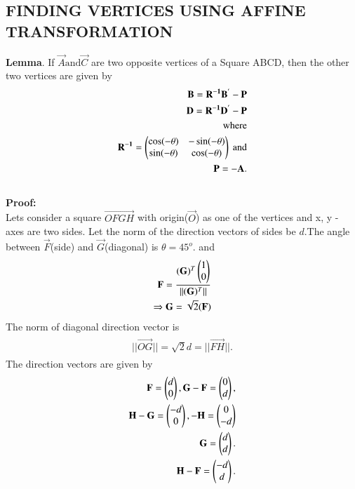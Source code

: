 \documentclass[journal,12pt,twocolumn]{IEEEtran}
\begin{document}
\subsection{FINDING VERTICES USING AFFINE TRANSFORMATION}
\textbf{Lemma}.
If $\vec{A} \text{and} \vec{C}$ are two opposite vertices of a Square ABCD, then the other two vertices are given by
\begin{align}
\begin{split}
\mathbf{B} = \mathbf{R^{-1}B^{'}}-\mathbf{P}\\
\mathbf{D} = \mathbf{R^{-1}D^{'}}-\mathbf{P}\\
\text{where}\\
\mathbf{R^{-1}} = \begin{pmatrix}\cos (-\theta) & -\sin (-\theta) \\ \sin (-\theta) & \cos (-\theta)\end{pmatrix} \ \text{and}\\
\mathbf{P} =  - \mathbf{A}.\\
\end{split}
\end{align}
\\
\textbf{Proof:}
\\
Lets consider a square $\vec{OFGH}$ with origin($\vec{O}$) as one of the vertices and x, y - axes are two sides.  Let the norm of the direction vectors of sides be $d$.The angle between $\vec{F}$(side) and $\vec{G}$(diagonal) is  $\theta = 45^{o}$. and
\begin{align}
\begin{split}
\mathbf{F} = \frac{(\mathbf{G})^T\begin{pmatrix}1\\0\end{pmatrix}}{\Vert(\mathbf{G})^T\Vert}\\
\Rightarrow \mathbf{G} = \sqrt{2}(\mathbf{F})\\
\end{split}
\end{align}
The norm of diagonal direction vector is
\begin{align}
\begin{split}
||\vec{OG}||=\sqrt{2}d=||\vec{FH}||.
\end{split}
\end{align}
The direction vectors are given by
\begin{align}
\begin{split}
\mathbf{F}=\begin{pmatrix}d\\0\end{pmatrix},\mathbf{G}-\mathbf{F}=\begin{pmatrix}0\\d\end{pmatrix},\\ \mathbf{H}-\mathbf{G}=\begin{pmatrix}-d\\0\end{pmatrix},-\mathbf{H}=\begin{pmatrix}0\\-d\end{pmatrix}\\
\mathbf{G}=\begin{pmatrix}d\\d\end{pmatrix}.\\
\mathbf{H}-\mathbf{F}=\begin{pmatrix}-d\\d\end{pmatrix}.\\
\end{split}
\end{align}
\end{document}
